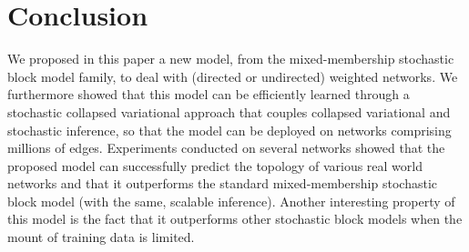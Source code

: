 \section{Conclusion}
\label{sec:concl}

We proposed in this paper a new model, from the mixed-membership stochastic block model family, to deal with (directed or undirected) weighted networks. We furthermore showed that this model can be efficiently learned through a stochastic collapsed variational approach that couples collapsed variational and stochastic inference, so that the model can be deployed on networks comprising millions of edges. Experiments conducted on several networks showed that the proposed model can successfully predict the topology of various real world networks and that it outperforms the standard mixed-membership stochastic block model (with the same, scalable inference). Another interesting property of this model is the fact that it outperforms other stochastic block models when the mount of training data is limited.

